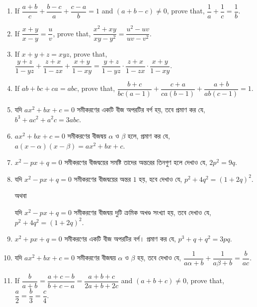 \documentclass[11pt, a4paper]{article}
\begin{document}
\begin{enumerate}
	\item If $\dfrac{a+b}{c} + \dfrac{b-c}{a} + \dfrac{c-a}{b} = 1$ and $(a+b-c) \neq 0$, prove that, $\dfrac{1}{a} + \dfrac{1}{c} = \dfrac{1}{b}$.
	
	\item If $\dfrac{x+y}{x-y} = \dfrac{u}{v}$, prove that, $\dfrac{x^2 + xy}{xy - y^2} = \dfrac{u^2 - uv}{uv - v^2}$.
	
	\item If $x+y+z = xyz$, prove that, $\dfrac{y+z}{1-yz} + \dfrac{z+x}{1-zx} + \dfrac{x+y}{1-xy} = \dfrac{y+z}{1-yz} \cdot \dfrac{z+x}{1-zx} \cdot \dfrac{x+y}{1-xy}$.
	
	\item If $ab+bc+ca = abc$, prove that, $\dfrac{b+c}{bc(a-1)} + \dfrac{c+a}{ca(b-1)} + \dfrac{a+b}{ab(c-1)} = 1$.

	\item \textbengali{যদি} $ax^2 + bx + c = 0$ \textbengali{সমীকরণের একটি বীজ অপরটির বর্গ হয়, তবে প্রমাণ কর যে,} $b^3 + ac^2 + a^2 c = 3abc$.
	
	\item $ax^2 + bx + c = 0$ \textbengali{সমীকরণের বীজদ্বয়} $\alpha$ \textbengali{ও} $\beta$ \textbengali{হলে, প্রমাণ কর যে,} $a(x-\alpha) (x-\beta) = ax^2 + bx + c$.
	
	\item $x^2 - px + q = 0$ \textbengali{সমীকরণের বীজদ্বয়ের সমষ্টি তাদের অন্তরের তিনগুণ হলে দেখাও যে,} $2p^2 = 9q$.
	
	\item \textbengali{যদি} $x^2 - px + q = 0$ \textbengali{সমীকরণের বীজদ্বয়ের অন্তর} $1$ \textbengali{হয়, হবে দেখাও যে,} $p^2 + 4q^2 = (1+2q)^2$.
		\begin{center}
		\textbengali{অথবা}
		\end{center}
		\textbengali{যদি} $x^2 - px + q = 0$ \textbengali{সমীকরণের বীজদ্বয় দুটি ক্রমিক অখণ্ড সংখ্যা হয়,}  \textbengali{তবে দেখাও যে,} $p^2 + 4q^2 = (1+2q)^2$.
		
	\item $x^2 + px + q = 0$ \textbengali{সমীকরণের একটি বীজ অপরটির বর্গ। প্রমাণ কর যে,} $p^3 + q + q^2 = 3pq$.
	
	\item \textbengali{যদি} $ax^2 + bx + c = 0$ \textbengali{সমীকরণের বীজদ্বয়} $\alpha$ \textbengali{ও} $\beta$ \textbengali{হয়, তবে দেখাও যে,} $\dfrac{1}{a\alpha + b} + \dfrac{1}{a\beta + b} = \dfrac{b}{ac}$.
	
	\item If $\dfrac{b}{a+b} = \dfrac{a+c-b}{b+c-a} = \dfrac{a+b+c}{2a+b+2c}$ and $(a+b+c) \neq 0$, prove that, $\dfrac{a}{2} = \dfrac{b}{3} = \dfrac{c}{4}$.
	

\end{enumerate}
\end{document}
